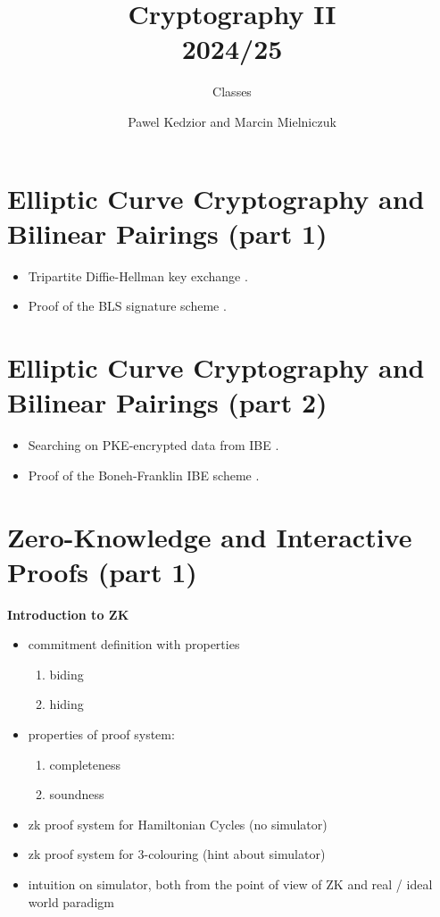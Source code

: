 \documentclass{llncs}
\title{Cryptography II\\ 2024/25}
\subtitle{Classes}
\author{Pawel Kedzior and Marcin Mielniczuk}
\institute{University of Warsaw}
\begin{document}
\maketitle

\section{Elliptic Curve Cryptography and Bilinear Pairings (part 1)}


\begin{itemize}
    \item Tripartite Diffie-Hellman key exchange \cite[Section 3.2]{tdh}.
    \item Proof of the BLS signature scheme \cite[Theorem 15.1]{Cryptobook}.
\end{itemize}


\section{Elliptic Curve Cryptography and Bilinear Pairings (part 2)}


\begin{itemize}
    \item Searching on PKE-encrypted data from IBE \cite[Section 15.6.4.3]{Cryptobook}.
    \item Proof of the Boneh-Franklin IBE scheme \cite[Theorem 15.6]{Cryptobook}.
\end{itemize}


\section{Zero-Knowledge and Interactive Proofs (part 1)}
\textbf{Introduction to ZK}
\begin{itemize}
	\item commitment definition with properties
		\begin{enumerate}
			\item biding
			\item hiding
		\end{enumerate}
	\item properties of proof system:
		\begin{enumerate}
			\item completeness
			\item soundness
		\end{enumerate}
	\item zk proof system for Hamiltonian Cycles (no simulator)
	\item zk proof system for  3-colouring (hint about simulator)
	\item intuition on simulator, both from the point of view of ZK and real / ideal world paradigm
\end{itemize}
\end{document}
